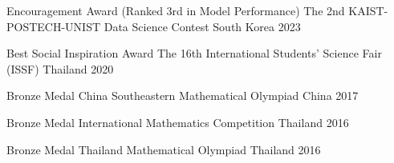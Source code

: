 



\begin{cvhonors}

  \cvhonor
    {Encouragement Award (Ranked 3rd in Model Performance)} %
    {The 2nd KAIST-POSTECH-UNIST Data Science Contest} %
    {South Korea} %
    {2023} %

  \cvhonor
    {Best Social Inspiration Award} %
    {The 16th International Students’ Science Fair (ISSF)} %
    {Thailand} %
    {2020} %

  \cvhonor
    {Bronze Medal} %
    {China Southeastern Mathematical Olympiad} %
    {China} %
    {2017} %

  \cvhonor
    {Bronze Medal} %
    {International Mathematics Competition} %
    {Thailand} %
    {2016} %

  \cvhonor
    {Bronze Medal} %
    {Thailand Mathematical Olympiad} %
    {Thailand} %
    {2016} %

\end{cvhonors}





